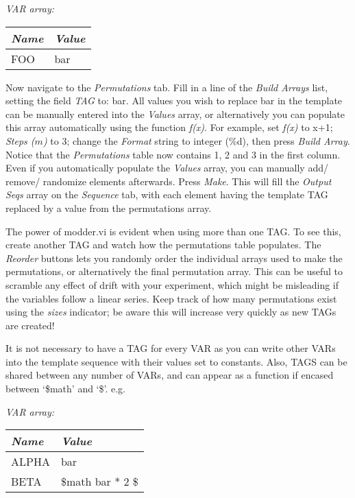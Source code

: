 \documentclass[10pt,a4paper]{article}
\begin{document}
\hangindent=0.7cm
\emph{VAR array:} \\
\begin{tabularx}{0.3\textwidth}{X|X}
	\emph{Name} & \emph{Value} \\
	\hline
	FOO & bar \\
\end{tabularx}
\vspace{3mm}

Now navigate to the \emph{Permutations} tab.  Fill in a line of the \emph{Build Arrays} list, setting the field \emph{TAG} to: bar.  All values you wish to replace bar in the template can be manually entered into the \emph{Values} array, or alternatively you can populate this array automatically using the function \emph{f(x)}.  For example, set \emph{f(x)} to x+1; \emph{Steps ($m$)} to 3; change the \emph{Format} string to integer (\%d), then press \emph{Build Array}.  Notice that the \emph{Permutations} table now contains 1, 2 and 3 in the first column.  Even if you automatically populate the \emph{Values} array, you can manually add/ remove/ randomize elements afterwards. Press \emph{Make}.  This will fill the \emph{Output Seqs} array on the \emph{Sequence} tab, with each element having the template TAG replaced by a value from the permutations array.

The power of modder.vi is evident when using more than one TAG.  To see this, create another TAG and watch how the permutations table populates.  The \emph{Reorder} buttons lets you randomly order the individual arrays used to make the permutations, or alternatively the final permutation array.  This can be useful to scramble any effect of drift with your experiment, which might be misleading if the variables follow a linear series.  Keep track of how many permutations exist using the \emph{sizes} indicator; be aware this will increase very quickly as new TAGs are created!

It is not necessary to have a TAG for every VAR as you can write other VARs into the template sequence with their values set to constants.  Also, TAGS can be shared between any number of VARs, and can appear as a function if encased between `\$math' and `\$'. e.g.

\hangindent=0.7cm
\emph{VAR array:} \\
\begin{tabularx}{0.5\textwidth}{X|X}
	\emph{Name} & \emph{Value} \\
	\hline	
	ALPHA & bar \\
	BETA & \$math bar * 2 \$
\end{tabularx}
\vspace{2mm}
\end{document}
